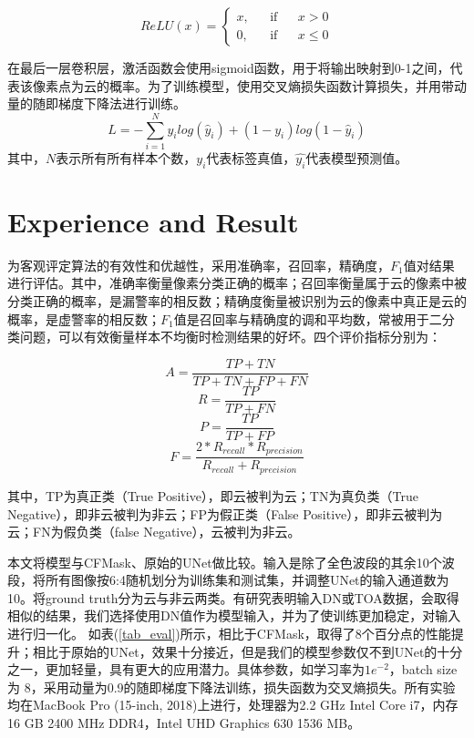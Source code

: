 \documentclass[UTF8]{ctexart}
\begin{document}
\begin{equation}
    ReLU(x)=\left\{
    \begin{aligned}
        x, & &\text{if} & & x > 0 \\
        0, & &\text{if} & & x \leq 0
    \end{aligned}
    \right.
\end{equation}

在最后一层卷积层，激活函数会使用sigmoid函数，用于将输出映射到0-1之间，代表该像素点为云的概率。为了训练模型，使用交叉熵损失函数计算损失，并用带动量的随即梯度下降法进行训练。
\begin{equation}
    L = -\sum_{i=1}^N y_ilog(\hat{y}_i)+(1-y_i)log(1-\hat{y}_i)
\end{equation}
其中，$N$表示所有所有样本个数，$y_i$代表标签真值，$\hat{y_i}$代表模型预测值。

\section[]{Experience and Result}

为客观评定算法的有效性和优越性，采用准确率，召回率，精确度，$F_1$值对结果进行评估。其中，准确率衡量像素分类正确的概率；召回率衡量属于云的像素中被分类正确的概率，是漏警率的相反数；精确度衡量被识别为云的像素中真正是云的概率，是虚警率的相反数；$F_1$值是召回率与精确度的调和平均数，常被用于二分类问题，可以有效衡量样本不均衡时检测结果的好坏。四个评价指标分别为：

\begin{equation}
    A = \frac{TP + TN}{TP + TN + FP + FN}\label{acc}
\end{equation}
\begin{equation}
    R = \frac{TP}{TP + FN}\label{recall}
\end{equation}
\begin{equation}
    P = \frac{TP}{TP + FP}\label{precision}
\end{equation}
\begin{equation}
    F = \frac{2 * R_{recall} * R_{precision}}{R_{recall} + R_{precision}}\label{f1}
\end{equation}

其中，TP为真正类（True Positive），即云被判为云；TN为真负类（True Negative），即非云被判为非云；FP为假正类（False Positive），即非云被判为云；FN为假负类（false Negative），云被判为非云。

本文将模型与CFMask、原始的UNet做比较。输入是除了全色波段的其余10个波段，将所有图像按6:4随机划分为训练集和测试集，并调整UNet的输入通道数为10。将ground truth分为云与非云两类。有研究表明\cite{chai2019cloud}输入DN或TOA数据，会取得相似的结果，我们选择使用DN值作为模型输入，并为了使训练更加稳定，对输入进行归一化。
如表(\ref{tab_eval})所示，相比于CFMask，取得了8个百分点的性能提升；相比于原始的UNet，效果十分接近，但是我们的模型参数仅不到UNet的十分之一，更加轻量，具有更大的应用潜力。具体参数，如学习率为$1e^{-2}$，batch size 为 8，采用动量为0.9的随即梯度下降法训练，损失函数为交叉熵损失。所有实验均在MacBook Pro (15-inch, 2018)上进行，处理器为2.2 GHz Intel Core i7，内存16 GB 2400 MHz DDR4，Intel UHD Graphics 630 1536 MB。
\end{document}

